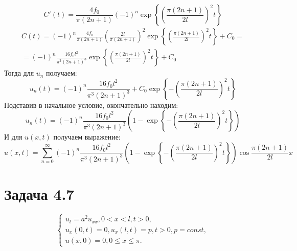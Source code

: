 \documentclass[11pt]{article}
\begin{document}
\begin{equation*}
C'(t) = \frac{4f_0}{\pi(2n + 1)}(-1)^n\exp\left\{\left(\frac{\pi(2n + 1)}{2l}\right)^2t\right\}
\end{equation*}
\begin{multline*}
C(t) = (-1)^n\frac{4f_0}{\pi(2n + 1)}\left(\frac{2l}{\pi(2n + 1)}\right)^2\exp\left\{\left(\frac{\pi(2n + 1)}{2l}\right)^2t\right\} + C_0 = \\
= (-1)^n\frac{16f_0l^2}{\pi^3(2n + 1)^3}\exp\left\{\left(\frac{\pi(2n + 1)}{2l}\right)^2t\right\} + C_0
\end{multline*}
Тогда для $u_n$ получаем:
\begin{equation*}
u_n(t) = (-1)^n\frac{16f_0l^2}{\pi^3(2n + 1)^3} + C_0\exp\left\{-\left(\frac{\pi(2n + 1)}{2l}\right)^2t\right\}
\end{equation*}
Подставив в начальное условие, окончательно находим:
\begin{equation*}
u_n(t) = (-1)^n\frac{16f_0l^2}{\pi^3(2n + 1)^3}\left(1 - \exp\left\{-\left(\frac{\pi(2n + 1)}{2l}\right)^2t\right\}\right)
\end{equation*}
И для $u(x, t)$ получаем выражение:
\begin{equation}
u(x, t) = \sum_{n = 0}^{\infty}(-1)^n\frac{16f_0l^2}{\pi^3(2n + 1)^3}\left(1 - \exp\left\{-\left(\frac{\pi(2n + 1)}{2l}\right)^2t\right\}\right)\cos\frac{\pi(2n + 1)}{2l}x
\end{equation}
\section{Задача 4.7}
\label{sec:orgfa69741}
\begin{equation}
\begin{cases}
u_t = a^2u_{xx}, 0 < x < l, t > 0, \\
u_x(0, t) = 0, u_x(l, t) = p, t > 0, p = const, \\
u(x, 0) = 0, 0 \leq x \leq \pi.
\end{cases}
\end{equation}
\end{document}
